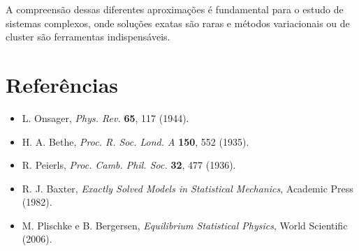 \documentclass[12pt]{article}
\begin{document}
A compreensão dessas diferentes aproximações é fundamental para o estudo de sistemas complexos, onde soluções exatas são raras e métodos variacionais ou de cluster são ferramentas indispensáveis.

\section*{Referências}

\begin{itemize}
    \item L. Onsager, \textit{Phys. Rev.} \textbf{65}, 117 (1944).
    \item H. A. Bethe, \textit{Proc. R. Soc. Lond. A} \textbf{150}, 552 (1935).
    \item R. Peierls, \textit{Proc. Camb. Phil. Soc.} \textbf{32}, 477 (1936).
    \item R. J. Baxter, \textit{Exactly Solved Models in Statistical Mechanics}, Academic Press (1982).
    \item M. Plischke e B. Bergersen, \textit{Equilibrium Statistical Physics}, World Scientific (2006).
\end{itemize}
\end{document}
